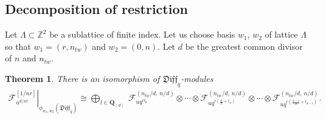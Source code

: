 \documentclass[pdftex]{sigma}
\numberwithin{equation}{section}
\newtheorem{Theorem}{Theorem}[section]
\theoremstyle{definition}
\newcommand{\qD}{\mathfrak{Diff}_q}
\begin{document}
\subsection{Decomposition of restriction}
Let $\Lambda \subset \mathbb{Z}^2$ be a sublattice of finite index. Let us choose basis $w_1$, $w_2$ of lattice $\Lambda$ so that $w_1 = (r,n_{tw})$ and $w_2 = (0, n)$. Let $d$ be the greatest common divisor of $n$ and $n_{tw}$.
\begin{Theorem} \label{th:general Lambda}
There is an isomorphism of $\qD$-modules
\begin{gather} \label{eq:iso from Lattice Th}
\left. \mathcal{F}^{[1/nr]}_{u^{d/nr}} \right|_{\phi_{w_1,w_2}(\qD)} \cong \bigoplus_{ l \in \mathbf{Q}_{(d)}} \ \mathcal{F}_{u q^{ rl_0}}^{(n_{tw}/d, \, n/d)} \otimes \cdots \otimes \mathcal{F}_{u q^{r(\frac{\alpha}{d}+ l_{\alpha})
}}^{(n_{tw}/d, \, n/d)} \otimes \cdots \otimes \mathcal{F}_{u q^{r(\frac{d-1}{d}+ l_{d-1})}}^{(n_{tw}/d, \, n/d)}.
\end{gather}
\end{Theorem}
\end{document}
